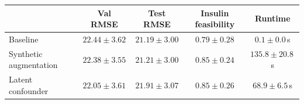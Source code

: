 \begin{tabular}{@{}lcccc@{}}
\toprule
 & Val RMSE & Test RMSE & Insulin feasibility & Runtime \\
\midrule
Baseline & $22.44 \pm 3.62$ & $21.19 \pm 3.00$ & $0.79 \pm 0.28$ & $0.1 \pm 0.0$\,s \\
Synthetic augmentation & $22.38 \pm 3.55$ & $21.21 \pm 3.00$ & $0.85 \pm 0.24$ & $135.8 \pm 20.8$\,s \\
Latent confounder & $22.05 \pm 3.61$ & $21.91 \pm 3.07$ & $0.85 \pm 0.26$ & $68.9 \pm 6.5$\,s \\
\bottomrule
\end{tabular}
